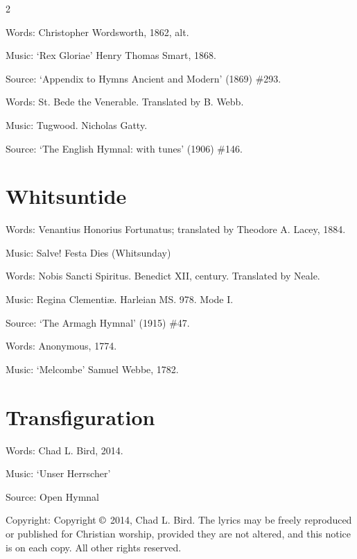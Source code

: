 \begin{multicols}{2}
\par\noindent
Words: Christopher Wordsworth, 1862, alt.
\par\noindent
Music: `Rex Gloriae' Henry Thomas Smart, 1868.
\par\noindent
Source: `Appendix to Hymns Ancient and Modern' (1869) \#293.


\par\noindent
Words: St. Bede the Venerable. Translated by B. Webb.
\par\noindent
Music: Tugwood. Nicholas Gatty.
\par\noindent
Source: `The English Hymnal: with tunes' (1906) \#146.



\section*{Whitsuntide}

\par\noindent
Words: Venantius Honorius Fortunatus; translated by Theodore A. Lacey, 1884.
\par\noindent
Music: Salve! Festa Dies (Whitsunday)


\par\noindent
Words: Nobis Sancti Spiritus. Benedict XII,  century. Translated by Neale.
\par\noindent
Music: Regina Clementi{\ae}. Harleian MS. 978. Mode I.
\par\noindent
Source: `The Armagh Hymnal' (1915) \#47.


\par\noindent
Words: Anonymous, 1774.
\par\noindent
Music: `Melcombe' Samuel Webbe, 1782.


\section*{Transfiguration}

\par\noindent
Words: Chad L. Bird, 2014.
\par\noindent
Music: `Unser Herrscher'
\par\noindent
Source: Open Hymnal
\par\noindent
Copyright: Copyright $\copyright$ 2014, Chad L. Bird. The lyrics may be freely reproduced or published for Christian worship, provided they are not altered, and this notice is on each copy. All other rights reserved.



\end{multicols}
